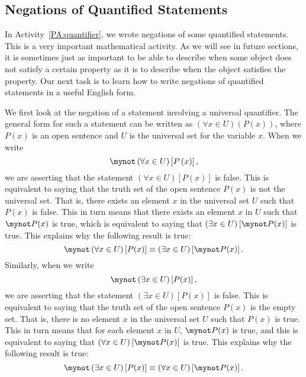\subsection*{Negations of Quantified Statements}
%
In \typeu Activity~\ref*{PA:quantifier}, we wrote negations of some quantified statements.  This is a very important mathematical activity.  As we will see in future sections, it is sometimes just as important to be able to describe when some object does not satisfy a certain property as it is to describe when the object satisfies the property.  Our next task is to learn how to write negations of quantified statements in a useful English form.

We first look at the negation of a statement involving a universal quantifier.  The general form for such a statement can be written as
$\left( {\forall x} \in U \right)\left( {P( x )} \right)$,
where  $P( x )$ is an open sentence and $U$ is the universal set for the variable $x$.  When we write
\[
\mynot  \left( {\forall x} \in U \right)\left[ {P\left( x \right)} \right],
\]
we are asserting that the statement  $\left( {\forall x} \in U \right)\left[ {P( x )} \right]$ is false.  This is equivalent to saying that the truth set of the open sentence   
$P( x )$ is not the universal set.  That is, there exists an element  $x$  in the universal set  $U$  such that  $P( x )$ is false.  This in turn means that there exists an element  $x$  in  $U$  such that  $\mynot  P( x )$ is true,   which is equivalent to saying that  $\left( {\exists x} \in U \right)\left[ {\mynot  P( x )} \right]$ is true.  This explains why the following result is true:
%
\[
\mynot  \left( {\forall x} \in U \right)\left[ {P( x )} \right] \equiv \left( {\exists x} \in U \right)\left[ {\mynot  P( x )} \right].
\]
Similarly, when we write
\[
\mynot  \left( {\exists x} \in U \right)\left[ {P( x )} \right],
\]
we are asserting that the statement  $\left( {\exists x} \in U \right)\left[ {P( x )} \right]$ is false.  This is equivalent to saying that the truth set of the open sentence  $P( x )$ is the empty set.  That is, there is no element  $x$  in the universal set  $U$  such that  
$P( x )$ is true.  This in turn means that for each element  $x$  in  $U$, 
$\mynot  P( x )$ is true, and this is equivalent to saying that  
$\left( {\forall x} \in U \right)\left[ {\mynot  P( x )} \right]$ is true.  This explains why the following result is true: 
\[
\mynot  \left( {\exists x} \in U \right)\left[ {P( x )} \right] \equiv \left( {\forall x} \in U \right)\left[ {\mynot  P( x )} \right].
\]
